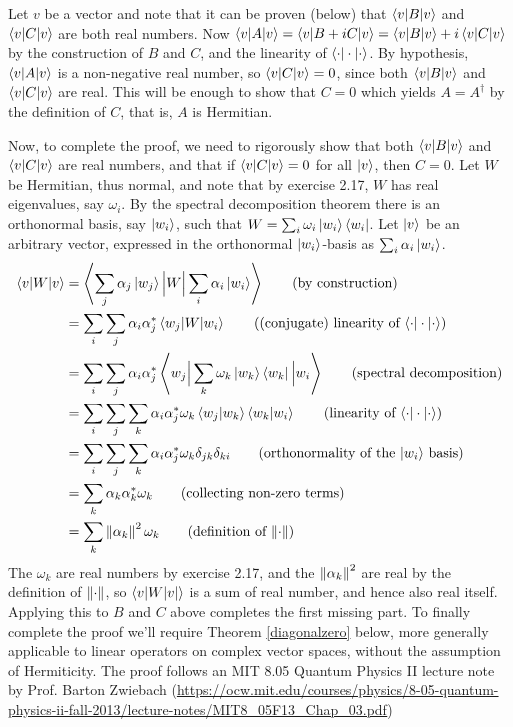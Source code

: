 Let $v$ be a vector and note that it can be proven (below) that $\braket{v | B | v}$ and $\braket{v | C | v}$  are both real numbers.    Now $\braket{v|A|v} = \braket{v|B+iC|v} = \braket{v|B|v} + i\braket{v|C|v}$ by the construction of $B$ and $C$, and the linearity of $\braket{\cdot|\cdot|\cdot}$.  By hypothesis, $\braket{v|A|v}$ is a non-negative real number, so $\braket{v|C|v} = 0$, since both $\braket{v | B | v}$ and $\braket{v | C | v}$  are real.  This will be enough to show that $C=0$ which yields $A=A^\dagger$ by the definition of $C$, that is, $A$ is Hermitian.

Now, to complete the proof, we need to rigorously show that both $\braket{v | B | v}$ and $\braket{v | C | v}$ are real numbers, and that if $\braket{v|C|v}=0$ for all $\ket{v}$, then $C = 0$. 
Let $W$ be Hermitian, thus normal, and note that by exercise 2.17, $W$ has real eigenvalues, say $\omega_i$.  By the spectral decomposition theorem there is an orthonormal basis, say $\ket{w_i}$, such that $W=\sum_i \omega_i\ket{w_i}\bra{w_i}$.  Let $\ket{v}$ be an arbitrary vector, expressed in the orthonormal $\ket{w_i}$-basis as $\sum_i \alpha_i\ket{w_i}$.
\begin{align*}
	\braket{v | W | v}  &= \left\langle\sum_j\alpha_j\ket{w_j} \Big\lvert  W \Big\rvert \sum_i\alpha_i\ket{w_i}\right\rangle \tag{by construction}\\
		&= \sum_i \sum_j \alpha_i\alpha_j^*\braket{w_j|W|w_i} \tag{(conjugate) linearity of $\braket{\cdot|\cdot|\cdot}$} \\
		&= \sum_i\sum_j \alpha_i\alpha_j^*\left\langle w_j\Big\lvert\sum_k \omega_k\ket{w_k}\bra{w_k}\Big\rvert w_i\right\rangle  \tag{spectral decomposition}\\
		&= \sum_i\sum_j\sum_k\alpha_i\alpha_j^*\omega_k\braket{w_j|w_k}\braket{w_k|w_i} \tag{linearity of $\braket{\cdot|\cdot|\cdot}$} \\
		&= \sum_i\sum_j\sum_k\alpha_i\alpha_j^*\omega_k\delta_{jk}\delta_{ki} \tag{orthonormality of the $\ket{w_i}$  basis}  \\
		&= \sum_k\alpha_k\alpha_k^*\omega_k \tag{collecting non-zero terms}\\
		&= \sum_k\norm{\alpha_k}^2\omega_k \tag{definition of $\norm{\cdot}$}
\end{align*}
The $\omega_k$ are real numbers by exercise 2.17, and the $\left\lVert\alpha_k\right\rVert^2$ are real by the definition of $\left\lVert\cdot\right\rVert$, so $\braket{v|W|v|}$ is a sum of real number,  and hence also real itself.  Applying this to $B$ and $C$ above completes the first missing part.  To finally complete the proof we'll require Theorem \ref{diagonalzero} below, more generally applicable to linear operators on complex vector spaces, without the assumption of Hermiticity.  The proof follows an MIT 8.05 Quantum Physics II lecture note  by Prof. Barton Zwiebach (\url{https://ocw.mit.edu/courses/physics/8-05-quantum-physics-ii-fall-2013/lecture-notes/MIT8_05F13_Chap_03.pdf})

